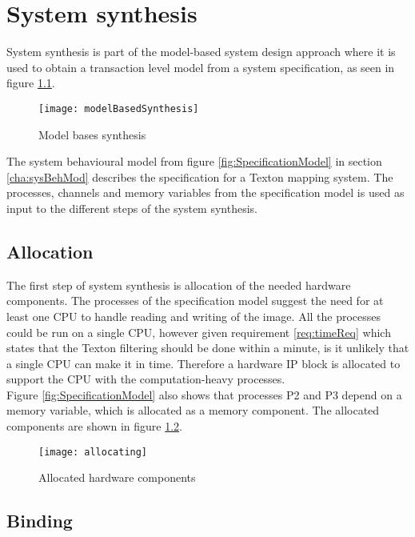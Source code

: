 \chapter{System synthesis}
System synthesis is part of the model-based system design approach where it is used to obtain a transaction level model from a system specification, as seen in figure \ref{fig:modelBasedSyn}. 

\begin{figure}[H]
\centering
\texttt{[image: modelBasedSynthesis]}
\caption{Model bases synthesis}
\label{fig:modelBasedSyn}
\end{figure}

The system behavioural model from figure \ref{fig:SpecificationModel} in section \ref{cha:sysBehMod} describes the specification for a Texton mapping system. 
The processes, channels and memory variables from the specification model is used as input to the different steps of the system synthesis.  

\section{Allocation}
The first step of system synthesis is allocation of the needed hardware components. 
The processes of the specification model suggest the need for at least one CPU to handle reading and writing of the image. 
All the processes could be run on a single CPU, however given requirement \ref{req:timeReq} which states that the Texton filtering should be done within a minute, is it unlikely that a single CPU can make it in time. 
Therefore a hardware IP block is allocated to support the CPU with the computation-heavy processes.
\\Figure \ref{fig:SpecificationModel} also shows that processes P2 and P3 depend on a memory variable, which is allocated as a memory component. The allocated components are shown in figure \ref{fig:allocHardComps}.

\begin{figure}[H]
\centering
\texttt{[image: allocating]}
\caption{Allocated hardware components}
\label{fig:allocHardComps}
\end{figure}




\section{Binding}

